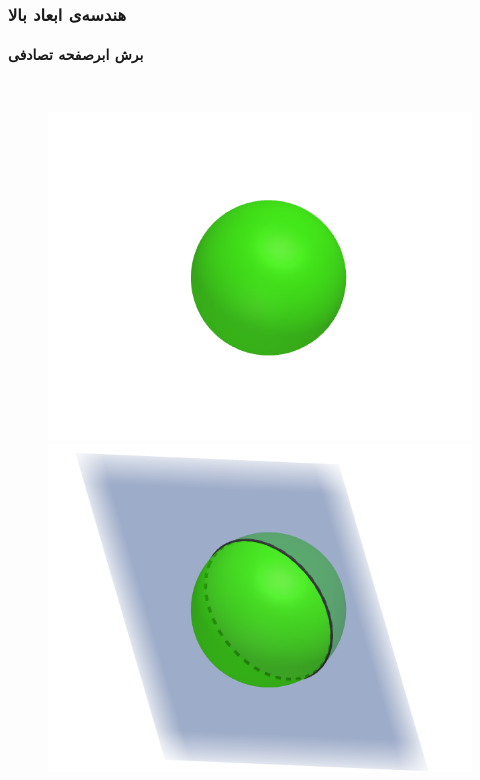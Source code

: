 \begin{frame}
\frametitle{هندسه‌ی ابعاد بالا}
\framesubtitle{برش ابرصفحه تصادفی}
\begin{columns}
\begin{figure}
    \begin{overprint}
    \includegraphics[scale=0.3]{Images/gif/1.png}
    \includegraphics[scale=0.3]{Images/gif/2.png}

\end{overprint}
\end{figure}
\end{columns}
\end{frame}
